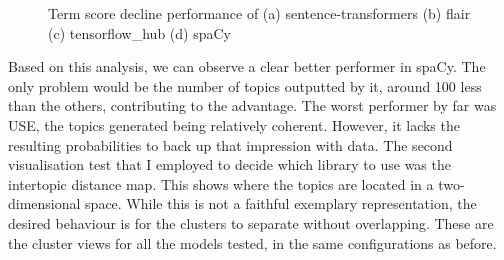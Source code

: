 \documentclass[12pt,MSc,a4paper,oneside]{muthesis}
\begin{document}
    \begin{figure}[h]
      \centering
      \caption{Term score decline performance of (a) sentence-transformers (b) flair (c) tensorflow\_hub (d) spaCy}
      \label{fig:foobar}
    \end{figure}

    Based on this analysis, we can observe a clear better performer in spaCy. The only problem would be the number of topics outputted by it, around 100 less than the others, contributing to the advantage. The worst performer by far was USE, the topics generated being relatively coherent. However, it lacks the resulting probabilities to back up that impression with data.
    The second visualisation test that I employed to decide which library to use was the intertopic distance map. This shows where the topics are located in a two-dimensional space. While this is not a faithful exemplary representation, the desired behaviour is for the clusters to separate without overlapping. These are the cluster views for all the models tested, in the same configurations as before.
\end{document}
